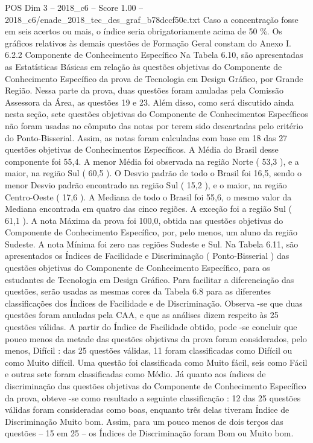\begin{textsample}{POS Dim 3 – 2018\_c6 – Score 1.00 – 2018\_c6/enade\_2018\_tec\_des\_graf\_b78dccf50c.txt}
Caso a concentração fosse em seis acertos ou mais, o índice seria obrigatoriamente acima de 50 \%.
Os gráficos relativos às demais questões de Formação Geral constam do Anexo I. 6.2.2 Componente de Conhecimento Específico Na Tabela 6.10, são apresentadas as Estatísticas Básicas em relação às questões objetivas do Componente de Conhecimento Específico da prova de Tecnologia em Design Gráfico, por Grande Região.
Nessa parte da prova, duas questões foram anuladas pela Comissão Assessora da Área, as questões 19 e 23.
Além disso, como será discutido ainda nesta seção, sete questões objetivas do Componente de Conhecimentos Específicos não foram usadas no cômputo das notas por terem sido descartadas pelo critério do Ponto-Bisserial.
Assim, as notas foram calculadas com base em 18 das 27 questões objetivas de Conhecimentos Específicos.
A Média do Brasil desse componente foi 55,4.
A menor Média foi observada na região Norte ( 53,3 ), e a maior, na região Sul ( 60,5 ).
O Desvio padrão de todo o Brasil foi 16,5, sendo o menor Desvio padrão encontrado na região Sul ( 15,2 ), e o maior, na região Centro-Oeste ( 17,6 ).
A Mediana de todo o Brasil foi 55,6, o mesmo valor da Mediana encontrada em quatro das cinco regiões.
A exceção foi a região Sul ( 61,1 ).
A nota Máxima da prova foi 100,0, obtida nas questões objetivas do Componente de Conhecimento Específico, por, pelo menos, um aluno da região Sudeste.
A nota Mínima foi zero nas regiões Sudeste e Sul.
Na Tabela 6.11, são apresentados os Índices de Facilidade e Discriminação ( Ponto-Bisserial ) das questões objetivas do Componente de Conhecimento Específico, para os estudantes de Tecnologia em Design Gráfico.
Para facilitar a diferenciação das questões, serão usadas as mesmas cores da Tabela 6.8 para as diferentes classificações dos Índices de Facilidade e de Discriminação.
Observa -se que duas questões foram anuladas pela CAA, e que as análises dizem respeito às 25 questões válidas.
A partir do Índice de Facilidade obtido, pode -se concluir que pouco menos da metade das questões objetivas da prova foram considerados, pelo menos, Difícil : das 25 questões válidas, 11 foram classificadas como Difícil ou como Muito difícil.
Uma questão foi classificada como Muito fácil, seis como Fácil e outras sete foram classificadas como Médio.
Já quanto aos índices de discriminação das questões objetivas do Componente de Conhecimento Específico da prova, obteve -se como resultado a seguinte classificação : 12 das 25 questões válidas foram consideradas como boas, enquanto três delas tiveram Índice de Discriminação Muito bom.
Assim, para um pouco menos de dois terços das questões – 15 em 25 – os Índices de Discriminação foram Bom ou Muito bom.

\end{textsample}
